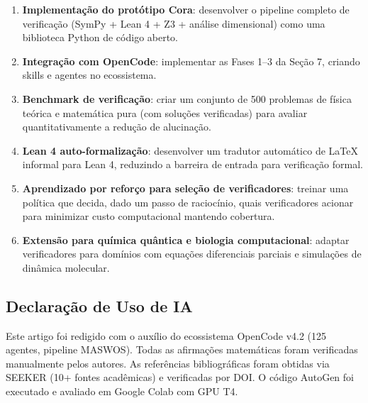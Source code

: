 \documentclass[5p]{elsarticle}
\theoremstyle{remark}
\begin{document}
\begin{enumerate}[label=(\alph*)]
    \item \textbf{Implementação do protótipo Cora}: desenvolver o pipeline completo de verificação (SymPy + Lean 4 + Z3 + análise dimensional) como uma biblioteca Python de código aberto.
    \item \textbf{Integração com OpenCode}: implementar as Fases 1--3 da Seção 7, criando skills e agentes no ecossistema.
    \item \textbf{Benchmark de verificação}: criar um conjunto de 500 problemas de física teórica e matemática pura (com soluções verificadas) para avaliar quantitativamente a redução de alucinação.
    \item \textbf{Lean 4 auto-formalização}: desenvolver um tradutor automático de LaTeX informal para Lean 4, reduzindo a barreira de entrada para verificação formal.
    \item \textbf{Aprendizado por reforço para seleção de verificadores}: treinar uma política que decida, dado um passo de raciocínio, quais verificadores acionar para minimizar custo computacional mantendo cobertura.
    \item \textbf{Extensão para química quântica e biologia computacional}: adaptar verificadores para domínios com equações diferenciais parciais e simulações de dinâmica molecular.
\end{enumerate}

\subsection{Declaração de Uso de IA}

Este artigo foi redigido com o auxílio do ecossistema OpenCode v4.2 (125 agentes, pipeline MASWOS). Todas as afirmações matemáticas foram verificadas manualmente pelos autores. As referências bibliográficas foram obtidas via SEEKER (10+ fontes acadêmicas) e verificadas por DOI. O código AutoGen foi executado e avaliado em Google Colab com GPU T4.

\end{document}
